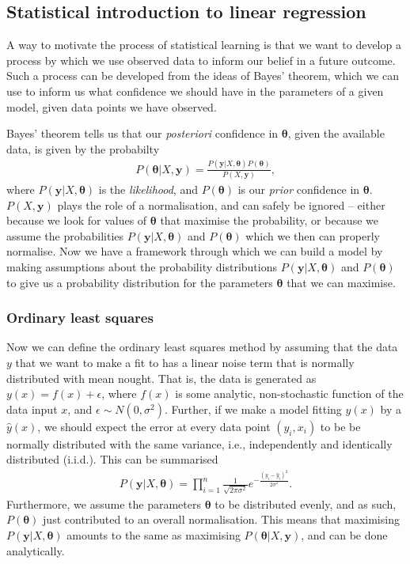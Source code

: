\documentclass[twocolumn,english,notitlepage]{article}
\renewcommand{\vec}[1]{\boldsymbol{#1}}
\renewcommand{\exp}[1]{e^{#1}}
\begin{document}
    \subsection{Statistical introduction to linear regression}
        A way to motivate the process of statistical learning is that we want to develop a process by which we use observed data to inform our belief in a future outcome. Such a process can be developed from the ideas of Bayes' theorem, which we can use to inform us what confidence we should have in the parameters of a given model, given data points we have observed.
        
        Bayes' theorem tells us that our \textit{posteriori} confidence in $\vec{\theta}$, given the available data, is given by the probabilty
        \begin{align}
            P(\vec{\theta}|X, \vec{y}) = \frac{P(\vec{y}|X,\vec{\vec{\theta}})P(\vec{\theta})}{P(X,\vec{y})},
        \end{align}
        where $P(\vec{y}|X, \vec{\theta})$ is the \textit{likelihood}, and $P(\vec{\theta})$ is our \textit{prior} confidence in $\vec{\theta}$. $P(X,\vec{y})$ plays the role of a normalisation, and can safely be ignored -- either because we look for values of $\vec{\theta}$ that maximise the probability, or because we assume the probabilities $P(\vec{y}|X,\vec{\theta})$ and $P(\vec{\theta})$ which we then can properly normalise. Now we have a framework through which we can build a model by making assumptions about the probability distributions $P(\vec{y}|X,\vec{\theta})$ and $P(\vec{\theta})$ to give us a probability distribution for the parameters $\vec{\theta}$ that we can maximise.


        \subsubsection{Ordinary least squares}
            Now we can define the ordinary least squares method by assuming that the data $y$ that we want to make a fit to has a linear noise term that is normally distributed with mean nought. That is, the data is generated as $y(x) = f(x) + \epsilon$, where $f(x)$ is some analytic, non-stochastic function of the data input $x$, and $\epsilon \sim N(0, \sigma^2)$. Further, if we make a model fitting $y(x)$ by a $\hat{y}(x)$, we should expect the error at every data point $(y_i, x_i)$ to be be normally distributed with the same variance, i.e., independently and identically distributed (i.i.d.). This can be summarised
            \begin{align}
                P(\vec{y}|X, \vec{\theta}) = \prod_{i=1}^{n} \frac{1}{\sqrt{2\pi\sigma^2}} \exp{-\frac{{(y_i-\hat{y}_i)}^2}{2\sigma^2}}.
            \end{align}
            Furthermore, we assume the parameters $\vec{\theta}$ to be distributed evenly, and as such, $P(\vec{\theta})$ just contributed to an overall normalisation. This means that maximising $P(\vec{y}|X, \vec{\theta})$ amounts to the same as maximising $P(\vec{\theta}|X, \vec{y})$, and can be done analytically.
\end{document}
